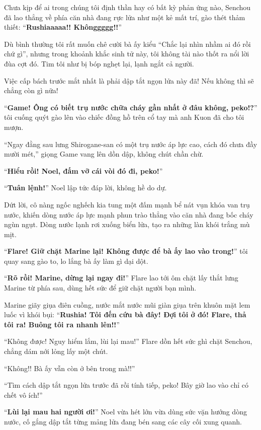 \documentclass[../main.tex]{subfiles}
\begin{document}
Chưa kịp để ai trong chúng tôi định thần hay có bất kỳ phản ứng nào, Senchou đã lao thẳng về phía căn nhà đang rực lửa như một kẻ mất trí, gào thét thảm thiết: ``\textbf{Rushiaaaaa!! Khônggggg!!}''

Dù bình thường tôi rất muốn chê cười bà ấy kiểu ``Chắc lại nhìn nhầm ai đó rồi chứ gì'', nhưng trong khoảnh khắc sinh tử này, tôi không tài nào thốt ra nổi lời đùa cợt đó. Tim tôi như bị bóp nghẹt lại, lạnh ngắt cả người.

Việc cấp bách trước mắt nhất là phải dập tắt ngọn lửa này đã! Nếu không thì sẽ chẳng còn gì nữa!

``\textbf{Game! Ông có biết trụ nước chữa cháy gần nhất ở đâu không, peko!?}'' tôi cuống quýt gào lên vào chiếc đồng hồ trên cổ tay mà anh Kuon đã cho tôi mượn.

``Ngay đằng sau lưng Shirogane-san có một trụ nước áp lực cao, cách đó chưa đầy mười mét,'' giọng Game vang lên dồn dập, không chút chần chừ.

``\textbf{Hiểu rồi! Noel, đấm vỡ cái vòi đó đi, peko!}''

``\textbf{Tuân lệnh!}'' Noel lập tức đáp lời, không hề do dự.

Dứt lời, cô nàng ngốc nghếch kia tung một đấm mạnh bể nát vụn khóa van trụ nước, khiến dòng nước áp lực mạnh phun trào thẳng vào căn nhà đang bốc cháy ngùn ngụt. Dòng nước lạnh rơi xuống biển lửa, tạo ra những làn khói trắng mù mịt.

``\textbf{Flare! Giữ chặt Marine lại! Không được để bà ấy lao vào trong!}'' tôi quay sang gào to, lo lắng bà ấy làm gì dại dột.

``\textbf{Rõ rồi! Marine, dừng lại ngay đi!}'' Flare lao tới ôm chặt lấy thắt lưng Marine từ phía sau, dùng hết sức để giữ chặt người bạn mình.

Marine giãy giụa điên cuồng, nước mắt nước mũi giàn giụa trên khuôn mặt lem luốc vì khói bụi: ``\textbf{Rushia! Tôi đến cứu bà đây! Đợi tôi ở đó! Flare, thả tôi ra! Buông tôi ra nhanh lên!!}''

``Không được! Nguy hiểm lắm, lùi lại mau!'' Flare dồn hết sức ghì chặt Senchou, chẳng dám nới lỏng lấy một chút.

``Không!! Bà ấy vẫn còn ở bên trong mà!!''

``Tìm cách dập tắt ngọn lửa trước đã rồi tính tiếp, peko! Bây giờ lao vào chỉ có chết vô ích!''

``\textbf{Lùi lại mau hai người ơi!}'' Noel vừa hét lớn vừa dùng sức vặn hướng dòng nước, cố gắng dập tắt từng mảng lửa đang bén sang các cây cối xung quanh.
\end{document}
